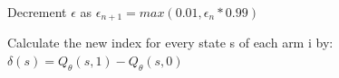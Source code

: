 \documentclass{slides}
\begin{document}
{\begin{algorithm}[H]
\begin{small}
\begin{algorithmic}[1]
        \State Decrement $\epsilon$ as $\epsilon_{n+1}=max(0.01,\epsilon_{n}*0.99)$
                
        
    \EndFor
    \State Calculate the new index for every state s of each arm i by:
        \Statex\hspace*{5mm} $\delta(s)=Q_{\theta}(s,1)-Q_{\theta}(s,0)$
\end{algorithmic}
\end{small}
\end{algorithm}
\newpage
\begin{center}
    

\end{center}}
\end{document}
